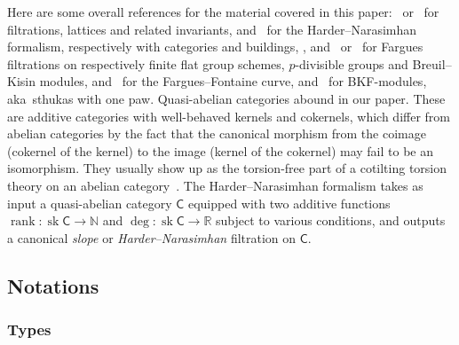 \documentclass[11pt]{article}
\theoremstyle{definition}
\numberwithin{equation}{section}
\numberwithin{figure}{section}
\numberwithin{table}{section}
\DeclareMathOperator{\rank}{rank}
\DeclareMathOperator{\sk}{sk}
\newcommand{\sfC}{\mathsf{C}}
\begin{document}
Here are some overall references for the material covered in this paper:~\cite{Co14} or~\cite{Co16} for filtrations, lattices and related invariants, \cite{An09} and~\cite{Co16} for the Harder--Narasimhan formalism, respectively with categories and buildings, \cite{Fa10}, \cite{Fa12} and~\cite{Imp16} or~\cite{LeWE16} for Fargues filtrations on respectively finite flat group schemes, $p$-divisible groups and Breuil--Kisin modules, \cite{FaFo15} and~\cite{Fa15} for the Fargues--Fontaine curve, \cite{ScWe15} and~\cite{BaMoSc16} for BKF-modules, aka~sthukas with one paw. Quasi-abelian categories abound in our paper. These are additive categories with well-behaved kernels and cokernels, which differ from abelian categories by the fact that the canonical morphism from the coimage (cokernel of the kernel) to the image (kernel of the cokernel) may fail to be an isomorphism. They usually show up as the torsion-free part of a cotilting torsion theory on an abelian category~\cite[App.\ B]{BoVdB03}. The Harder--Narasimhan formalism takes as input a quasi-abelian category $\sfC$ equipped with two additive functions $\rank:\sk\sfC\rightarrow\mathbb{N}$ and $\deg:\sk\sfC\rightarrow\mathbb{R}$ subject to various conditions, and outputs a canonical \emph{slope} or \emph{Harder--Narasimhan} filtration on $\sfC$.

\subsection{Notations}

\subsubsection{Types}\label{subsec:Types}
\end{document}
